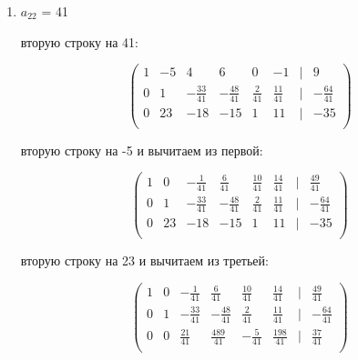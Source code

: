\documentclass{report}
\begin{document}
\begin{itemize}
\begin{enumerate}
\begin{itemize}
			\end{itemize}
			
			\newpage
			
			\item{$a_{22}$ = 41}
			
			\begin{itemize}
				 вторую строку на 41:
				
				\begin{center}
					\Large{
						\[
						\begin{pmatrix}
							1 & -5 & 4 & 6 & 0 & -1 & | & 9 \\
							0 & 1 & -\frac{33}{41} & -\frac{48}{41} & \frac{2}{41} & \frac{11}{41} & | & -\frac{64}{41} \\
							0 & 23 & -18 & -15 & 1 & 11 & | & -35 \\
						\end{pmatrix}
						\]
					}
				\end{center}
				
				 вторую строку на -5 и вычитаем из первой:
				
				\begin{center}
					\Large{
						\[
						\begin{pmatrix}
							1 & 0 & -\frac{1}{41} & \frac{6}{41} & \frac{10}{41} & \frac{14}{41} & | & \frac{49}{41} \\
							0 & 1 & -\frac{33}{41} & -\frac{48}{41} & \frac{2}{41} & \frac{11}{41} & | & -\frac{64}{41} \\
							0 & 23 & -18 & -15 & 1 & 11 & | & -35 \\
						\end{pmatrix}
						\]
					}
				\end{center}
				
				 вторую строку на 23 и вычитаем из третьей:
				
				\begin{center}
					\Large{
						\[
						\begin{pmatrix}
							1 & 0 & -\frac{1}{41} & \frac{6}{41} & \frac{10}{41} & \frac{14}{41} & | & \frac{49}{41} \\
							0 & 1 & -\frac{33}{41} & -\frac{48}{41} & \frac{2}{41} & \frac{11}{41} & | & -\frac{64}{41} \\
							0 & 0 & \frac{21}{41} & \frac{489}{41} & -\frac{5}{41} & \frac{198}{41} & | & \frac{37}{41} \\
						\end{pmatrix}
						\]
					}
				\end{center}
				

\end{itemize}
\end{enumerate}
\end{itemize}
\end{document}
